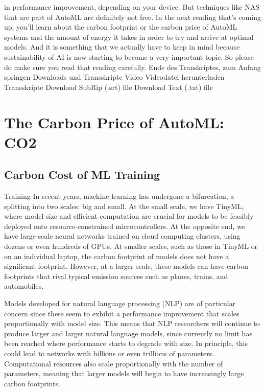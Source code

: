 {{{{    in performance improvement, depending on your device.
    But techniques like NAS that are part of AutoML are definitely not free.
    In the next reading that's coming up, you'll
    learn about the carbon footprint or the carbon price of AutoML systems
    and the amount of energy it takes in order
    to try and arrive at optimal models.
    And it is something that we actually have
    to keep in mind because sustainability of AI
    is now starting to become a very important topic.
    So please do make sure you read that reading carefully.
    Ende des Transkriptes, zum Anfang springen
    Downloads und Transskripte
    Video
    Videodatei herunterladen
    Transskripte
    Download SubRip (.srt) file
    Download Text (.txt) file  

\section{The Carbon Price of AutoML: CO2}

    \subsection{Carbon Cost of ML Training}
    
    Training In recent years, machine learning has undergone a bifurcation, a splitting into two scales: big and small. At the small scale, we have TinyML, where model size and efficient computation are crucial for models to be feasibly deployed onto resource-constrained microcontrollers. At the opposite end, we have large-scale neural networks trained on cloud computing clusters, using dozens or even hundreds of GPUs. At smaller scales, such as those in TinyML or on an individual laptop, the carbon footprint of models does not have a significant footprint. However, at a larger scale, these models can have carbon footprints that rival typical emission sources such as planes, trains, and automobiles.
    
    Models developed for natural language processing (NLP) are of particular concern since these seem to exhibit a performance improvement that scales proportionally with model size. This means that NLP researchers will continue to produce larger and larger natural language models, since currently no limit has been reached where performance starts to degrade with size. In principle, this could lead to networks with billions or even trillions of parameters. Computational resources also scale proportionally with the number of parameters, meaning that larger models will begin to have increasingly large carbon footprints.
    
}}}}
